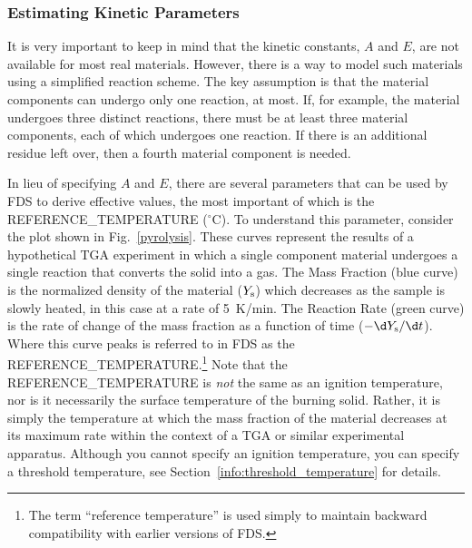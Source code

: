 \documentclass[11pt]{book}
\begin{document}
\subsubsection{Estimating Kinetic Parameters}

It is very important to keep in mind that the kinetic constants, $A$ and $E$, are not available for most real materials.  However, there is a way to model such materials using a simplified reaction scheme. The key assumption is that the material components can undergo only one reaction, at most. If, for example, the material undergoes three distinct reactions, there must be at least three material components, each of which undergoes one reaction. If there is an additional residue left over, then a fourth material component is needed.

In lieu of specifying $A$ and $E$, there are several parameters that can be used by FDS to derive effective values, the most important of which is the  {\ct REFERENCE\_TEMPERATURE} ($^\circ$C). To understand this parameter, consider the plot shown in Fig.~\ref{pyrolysis}. These curves represent the results of a hypothetical TGA experiment in which a single component material undergoes a single reaction that converts the solid into a gas. The Mass Fraction (blue curve) is the normalized density of the material ($Y_{\rm s}$) which decreases as the sample is slowly heated, in this case at a rate of 5~K/min. The Reaction Rate (green curve) is the rate of change of the mass fraction as a function of time ($-\d Y_{\rm s}/\d t$). Where this curve peaks is referred to in FDS as the {\ct REFERENCE\_TEMPERATURE}.\footnote{The term ``reference temperature'' is used simply to maintain backward compatibility with earlier versions of FDS.}  Note that the {\ct REFERENCE\_TEMPERATURE} is {\em not} the same as an ignition temperature, nor is it necessarily the surface temperature of the burning solid. Rather, it is simply the temperature at which the mass fraction of the material decreases at its maximum rate within the context of a TGA or similar experimental apparatus. Although you cannot specify an ignition temperature, you can specify a threshold temperature, see Section~\ref{info:threshold_temperature} for details.
\end{document}
